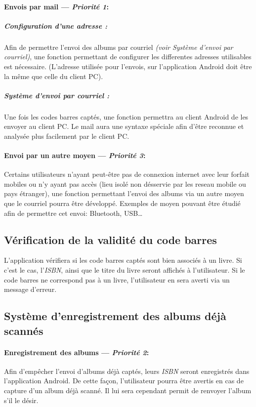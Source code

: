 \paragraph{Envois par mail ---  \textit{Priorité 1}:}
\subparagraph{Configuration d'une adresse :}
Afin de permettre l'envoi des albums par courriel \textit{(voir Système d'envoi par courriel)}, une fonction permettant de configurer les differentes adresses utilisables est nécessaire. (L'adresse utilisée pour l'envois, sur l'application Android doit être la même que celle du client PC).

\subparagraph{Système d'envoi par courriel :} 
Une fois les codes barres captés, une fonction permettra au client Android de les envoyer au client PC. 
Le mail aura une syntaxe spéciale afin d'être reconnue et analysée plus facilement par le client PC. 

\paragraph{Envoi par un autre moyen ---  \textit{Priorité 3}:}
Certains utilisateurs n'ayant peut-être pas de connexion internet avec leur forfait mobiles ou n'y ayant pas accès (lieu isolé non désservie par les reseau mobile ou pays étranger), une fonction permettant l'envoi des albums via un autre moyen que le courriel pourra être développé.
Exemples de moyen pouvant être étudié afin de permettre cet envoi: Bluetooth, USB…

\subsection{Vérification de la validité du code barres}
L'application vérifiera si les code barres captés sont bien associés à un livre.
Si c'est le cas, l'\emph{ISBN}, ainsi que le titre du livre seront affichés à l'utilisateur.
Si le code barres ne correspond pas à un livre, l'utilisateur en sera averti via un message d'erreur.

\subsection{Système d'enregistrement des albums déjà scannés}
\paragraph{Enregistrement des albums ---  \textit{Priorité 2}:} 
Afin d'empêcher l'envoi d'albums déjà captés, leurs \emph{ISBN} seront enregistrés dans l'application Android. 
De cette façon, l'utilisateur pourra être avertis en cas de capture d'un album déjà scanné.
Il lui sera cependant permit de renvoyer l'album s'il le désir.

